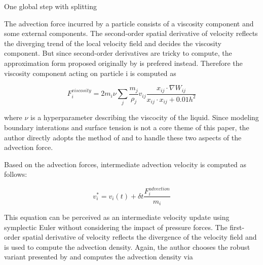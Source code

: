 \documentclass[
	11pt, 
	DIV10,
	ngerman,
	a4paper, 
	oneside, 
	headings=normal, 
	captions=tableheading,
	final, 
	numbers=noenddot
]{scrartcl}
\begin{document}
\large
\vskip 0.2in
\begin{algorithm}
	\DontPrintSemicolon
	\SetAlgoLined
	\SetAlCapNameFnt{\large}
	\SetAlCapFnt{\large}
	\caption{\label{alg1} One global step with splitting \cite{reinhardt2017fully}}
\end{algorithm}
\vskip 0.2in
\normalsize

The advection force incurred by a particle consists of a viscosity component and some external components. The second-order spatial derivative of velocity reflects the diverging trend of the local velocity field and decides the viscosity component. But since second-order derivatives are tricky to compute, the approximation form proposed originally by \cite{monaghan1992smoothed} is prefered instead. Therefore the viscosity component acting on particle i is computed as

\begin{equation}
	\label{eq2}
	F_{i}^{viscosity} = 2m_{i}\nu \sum_{j}\frac{m_{j}}{\rho_{j}}v_{ij}\frac{x_{ij} \cdot \nabla W_{ij}}{x_{ij}\cdot x_{ij} + 0.01h^{2}}
\end{equation}

where $ \nu $ is a hyperparameter describing the viscocity of the liquid. Since modeling boundary interations and surface tension is not a core theme of this paper, the author directly adopts the method of \cite{akinci2012versatile} and \cite{huber2015evaluation} to handle these two aspects of the advection force.
\par
Based on the advection forces, intermediate advection velocity is computed as follows:

\begin{equation}
	\label{eq3}
	v_{i}^{*} = v_{i}(t) + \delta t\frac{F_{i}^{advection}}{m_{i}}
\end{equation}

This equation can be perceived as an intermediate velocity update using symplectic Euler without considering the impact of pressure forces. The first-order spatial derivative of velocity reflects the divergence of the velocity field and is used to compute the advection density. Again, the author chooses the robust variant presented by \cite{monaghan1992smoothed} and computes the advection density via
\end{document}
